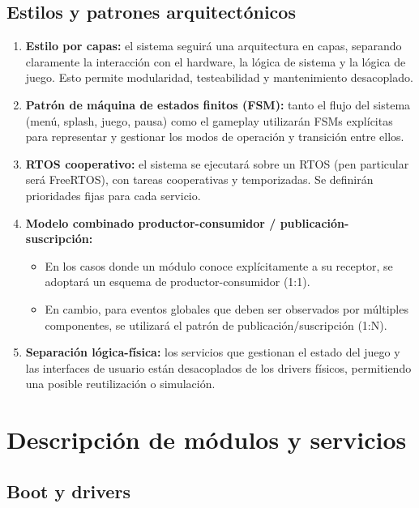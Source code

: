 \documentclass[11pt,a4paper]{article}
\begin{document}
\subsection{Estilos y patrones arquitectónicos}
\begin{enumerate}
  \item \textbf{Estilo por capas:} el sistema seguirá una arquitectura en capas, separando claramente la interacción con el hardware, la lógica de sistema y la lógica de juego. Esto permite modularidad, testeabilidad y mantenimiento desacoplado.
  \item \textbf{Patrón de máquina de estados finitos (FSM):} tanto el flujo del sistema (menú, splash, juego, pausa) como el gameplay utilizarán FSMs explícitas para representar y gestionar los modos de operación y transición entre ellos.
  \item \textbf{RTOS cooperativo:} el sistema se ejecutará sobre un RTOS (pen particular será FreeRTOS), con tareas cooperativas y temporizadas. Se definirán prioridades fijas para cada servicio.
  \item \textbf{Modelo combinado productor-consumidor / publicación-suscripción:} 
  \begin{itemize}
    \item En los casos donde un módulo conoce explícitamente a su receptor, se adoptará un esquema de productor-consumidor (1:1). 
    \item En cambio, para eventos globales que deben ser observados por múltiples componentes, se utilizará el patrón de publicación/suscripción (1:N). 
  \end{itemize}
  \item \textbf{Separación lógica-física:} los servicios que gestionan el estado del juego y las interfaces de usuario están desacoplados de los drivers físicos, permitiendo una posible reutilización o simulación.
\end{enumerate}

\section{Descripción de módulos y servicios}

\subsection{Boot y drivers}
\end{document}
